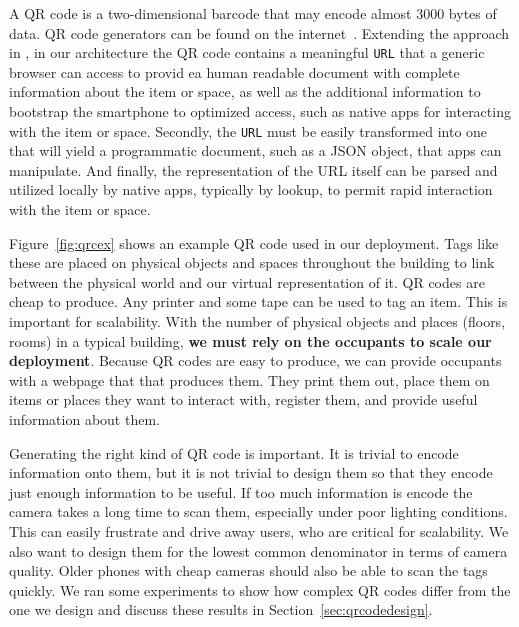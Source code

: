 A QR code is a two-dimensional barcode that may encode almost 3000 bytes of data.  QR code generators
can be found on the internet~\cite{qrcgen1, qrcgen2}.  
Extending the approach in \cite{hbci}, in
our
architecture the QR code contains a meaningful {\tt URL} that a
generic browser can access to provid ea human readable document with complete
information about the item or space, as well as the additional
information to bootstrap the smartphone to optimized access, such as
native apps for interacting with the item or space.  Secondly, the 
{\tt URL}  must be easily transformed into one that will yield a
programmatic document, such as a JSON object, that apps can
manipulate.  And finally, the representation of the URL itself can be
parsed and utilized locally by native apps, typically by lookup, to
permit rapid interaction with the item or space.


Figure~\ref{fig:qrcex} shows an example QR code used in our deployment.  Tags like these are placed on physical
objects and spaces throughout the building to link between the physical world and our virtual representation of it.
QR codes are cheap to produce.  Any printer and some tape can be used to tag an item.  This is important for scalability.
With the number of physical objects and places (floors, rooms) in a typical building, {\bf we must rely on the occupants
to scale our deployment}. Because QR codes are easy to produce, we can provide occupants with a webpage that
that produces them.  They print them out, place them on items or
places they want to interact with, register them, and provide useful
information about them.

Generating the right kind of QR code is important.  It is trivial to
encode information onto them, but it is
not trivial to design them so that they encode just enough information to be useful.  If 
too much information is encode the camera takes a long time to scan them, especially under poor lighting
conditions.  This can easily frustrate and drive away users, who are critical for scalability.
We also want to design them for the lowest common denominator in terms of camera quality.  Older
phones with cheap cameras should also be able to scan the tags quickly.  We ran some experiments to show
how complex QR codes differ from the one we design and discuss these results in Section~\ref{sec:qrcodedesign}.

